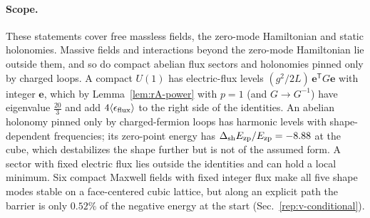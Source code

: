 \paragraph{Scope.}
These statements cover free massless fields, the zero-mode Hamiltonian and static holonomies.
Massive fields and interactions beyond the zero-mode Hamiltonian lie outside them, and so do compact abelian flux sectors and holonomies pinned only by charged loops. %
A compact $U(1)$ has electric-flux levels $(g^2/2L)\,\bm e^{\mathsf T}G\bm e$ with integer $\bm e$, which by Lemma~\ref{lem:rA-power} with $p=1$ (and $G\to G^{-1}$) have eigenvalue $\tfrac{20}3$ and add $4\langle\epsilon_{\rm flux}\rangle$ to the right side of the identities.
An abelian holonomy pinned only by charged-fermion loops has harmonic levels with shape-dependent frequencies; its zero-point energy has $\Delta_{\mathrm{sh}}E_{\rm zp}/E_{\rm zp}=-8.88$ at the cube, which destabilizes the shape further but is not of the assumed form. %
A sector with fixed electric flux lies outside the identities and can hold a local minimum. %
Six compact Maxwell fields with fixed integer flux make all five shape modes stable on a face-centered cubic lattice, but along an explicit path the barrier is only $0.52\%$ of the negative energy at the start (Sec.~\ref{rep:v-conditional}). %

